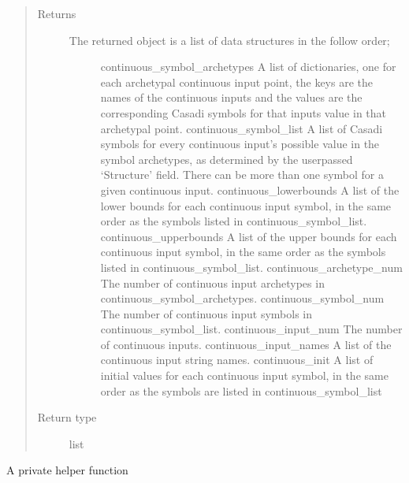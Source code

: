 \documentclass[letterpaper,10pt,english,openany,oneside]{sphinxmanual}
\begin{document}
\begin{fulllineitems}
\begin{fulllineitems}
\begin{quote}
\begin{description}
\begin{itemize}
\end{itemize}

\item[{Returns}] \leavevmode
\begin{description}
\item[{The returned object is a list of data structures in the follow order;}] \leavevmode
continuous\_symbol\_archetypes \textendash{} A list of dictionaries, one for each archetypal
continuous input point, the keys are the names of the continuous inputs and the
values are the corresponding Casadi symbols for that inputs value in that archetypal
point.
continuous\_symbol\_list \textendash{} A list of Casadi symbols for every continuous input’s possible
value in the symbol archetypes, as determined by the user\sphinxhyphen{}passed ‘Structure’ field.
There can be more than one symbol for a given continuous input.
continuous\_lowerbounds \textendash{} A list of the lower bounds for each continuous input symbol,
in the same order as the symbols listed in continuous\_symbol\_list.
continuous\_upperbounds \textendash{} A list of the upper bounds for each continuous input symbol,
in the same order as the symbols listed in continuous\_symbol\_list.
continuous\_archetype\_num \textendash{} The number of continuous input archetypes in continuous\_symbol\_archetypes.
continuous\_symbol\_num \textendash{} The number of continuous input symbols in continuous\_symbol\_list.
continuous\_input\_num \textendash{} The number of continuous inputs.
continuous\_input\_names \textendash{} A list of the continuous input string names.
continuous\_init \textendash{} A list of initial values for each continuous input symbol, in the
same order as the symbols are listed in continuous\_symbol\_list

\end{description}


\item[{Return type}] \leavevmode
list

\end{description}\end{quote}

\end{fulllineitems}


\begin{fulllineitems}
\label{\detokenize{nloed:nloed.design.Design.__optim_settup}}
A private helper function


\end{fulllineitems}
\end{fulllineitems}
\end{document}
